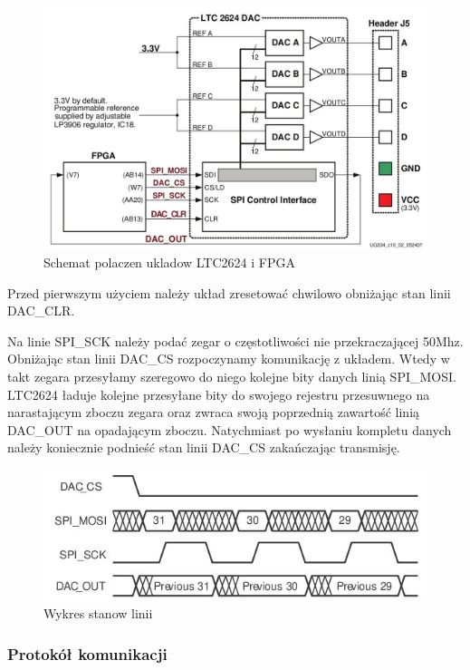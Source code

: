 \documentclass[a4paper,12pt]{article}
\begin{document}
\begin{figure}[htb]
   \centering
   \includegraphics[width=15cm]{grafika/dac.jpg}
   \caption{Schemat polaczen ukladow LTC2624 i FPGA}
\end{figure}

Przed pierwszym użyciem należy układ zresetować chwilowo obniżając stan linii DAC\_CLR.

Na linie SPI\_SCK należy podać zegar o częstotliwości nie przekraczającej 50Mhz. Obniżając stan linii DAC\_CS rozpoczynamy komunikację z układem. Wtedy w takt zegara przesyłamy szeregowo do niego kolejne bity danych linią SPI\_MOSI. LTC2624 ładuje kolejne przesyłane bity do swojego rejestru przesuwnego na narastającym zboczu zegara oraz zwraca swoją poprzednią zawartość linią DAC\_OUT na opadającym zboczu. Natychmiast po wysłaniu kompletu danych należy koniecznie podnieść stan linii DAC\_CS zakańczając transmisję.

\begin{figure}[htb]
   \centering
   \includegraphics[width=15cm]{grafika/dac-waveform.jpg}
   \caption{Wykres stanow linii}
\end{figure}


\newpage
\subsubsection{Protokół komunikacji}
\end{document}
